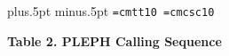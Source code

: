 \parindent=0pt\parskip=8pt
 plus.5pt minus.5pt
\lineskiplimit=1pt\lineskip=1pt
\font\tt=cmtt10
\font\csc=cmcsc10
\newcount\inum
\def\vp{\vskip\parskip}
\def\pf{\par\filbreak}
\def\el{\hfill\break}
\def\itm#1{\leavevmode\hangindent.75truein\hangafter=1
\advance\inum by 1
\hbox to2em{\rm\hfil\number\inum. }#1\vadjust{\kern5pt}\el}
\def\ul#1{$\underline{\hbox{\sl\strut#1}}$}
\def\hdg#1{\vskip4pt\leavevmode\kern-1em \ul{#1}\par}
\centerline{\bf Table 2. PLEPH Calling Sequence}
\vskip8pt

